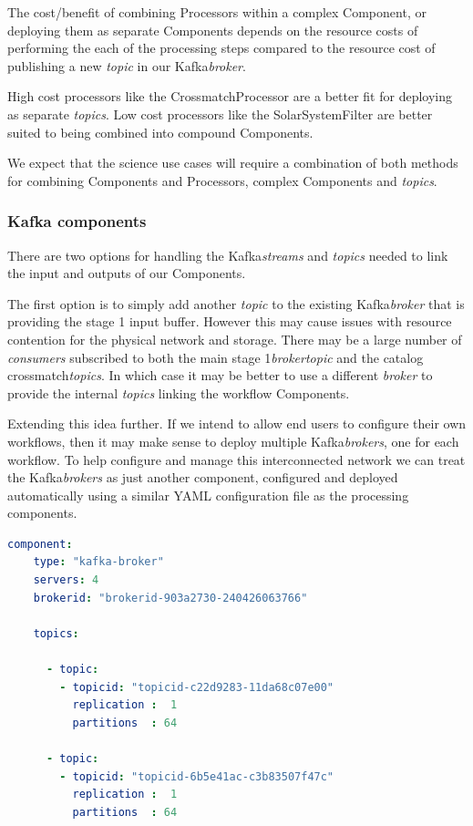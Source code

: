 \documentclass{article}
\newcommand{\yaml} {YAML\xspace}
\newcommand{\kafka} {Kafka\xspace}
\newcommand{\kftopic} {\textit{topic}\xspace}
\newcommand{\kftopics} {\textit{topics}\xspace}
\newcommand{\kfstreams} {\textit{streams}\xspace}
\newcommand{\kfbroker} {\textit{broker}\xspace}
\newcommand{\kfbrokers} {\textit{brokers}\xspace}
\newcommand{\kfconsumers} {\textit{consumers}\xspace}
\newcommand{\crossmatch} {crossmatch\xspace}
\newcommand{\catalog} {catalog\xspace}
\newcommand{\stageone} {stage 1\xspace}
\newcommand{\javaname}[1] {{\ttfamily\color{codeblue} #1}}
\newcommand{\javaplural}[1] {\javaname{#1}s}
\begin{document}
The cost/benefit of combining \javaplural{Processor} within a complex \javaname{Component}, or deploying them as separate \javaplural{Component} depends on the resource costs of performing the each of the processing steps compared to the resource cost of publishing a new \kftopic in our \kafka \kfbroker.

High cost processors like the \javaname{CrossmatchProcessor} are a better fit for deploying as separate \kftopics. Low cost processors like the \javaname{SolarSystemFilter} are better suited to being combined into compound \javaname{Components}.

We expect that the science use cases will require a combination of both methods for combining \javaplural{Component} and \javaplural{Processor}, complex \javaplural{Component} and \kftopics.

\subsubsection{Kafka components}
\label{workflow.kafka-components}

There are two options for handling the \kafka \kfstreams and \kftopics needed to link the input and outputs of our \javaplural{Component}. 

The first option is to simply add another \kftopic to the existing \kafka \kfbroker that is providing the \stageone input buffer. However this may cause issues with resource contention for the physical network and storage.
There may be a large number of \kfconsumers subscribed to both the main \stageone \kfbroker \kftopic and the \catalog \crossmatch \kftopics.
In which case it may be better to use a different \kfbroker to provide the internal \kftopics linking the workflow \javaplural{Component}.

Extending this idea further.
If we intend to allow end users to configure their own workflows, then it may make sense to deploy multiple \kafka \kfbrokers, one for each workflow.
To help configure and manage this interconnected network we can treat the \kafka \kfbrokers as just another component, configured and deployed automatically using a similar \yaml configuration file as the processing components.

\begin{lstlisting}[language=yaml]
  component:
    type: "kafka-broker"
    servers: 4 
    brokerid: "brokerid-903a2730-240426063766"

    topics:

      - topic:
        - topicid: "topicid-c22d9283-11da68c07e00"
          replication :  1
          partitions  : 64

      - topic:
        - topicid: "topicid-6b5e41ac-c3b83507f47c"
          replication :  1
          partitions  : 64
\end{lstlisting}
\end{document}
